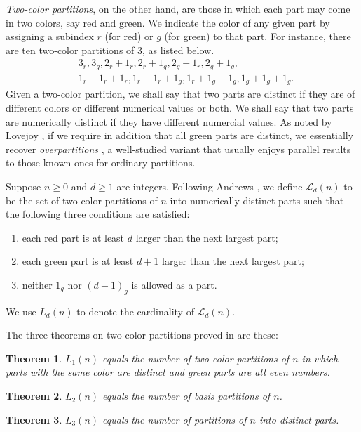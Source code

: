 \documentclass[11pt,reqno]{amsart}
\numberwithin{equation}{section}
\theoremstyle{plain}
\newtheorem{theorem}{Theorem}[section]
\theoremstyle{definition}
\renewcommand{\L}{\mathcal{L}}
\begin{document}
{\it Two-color partitions}, on the other hand, are those in which each part may come in two colors, say red and green. We indicate the color of any given part by assigning a subindex $r$ (for red) or $g$ (for green) to that part. For instance, there are ten two-color partitions of $3$, as listed below.
\begin{align*}
& 3_r, 3_g, 2_r+1_r, 2_r+1_g, 2_g+1_r, 2_g+1_g,\\
& 1_r+1_r+1_r, 1_r+1_r+1_g, 1_r+1_g+1_g, 1_g+1_g+1_g.
\end{align*}
Given a two-color partition, we shall say that two parts are distinct if they are of different colors or different numerical values or both. We shall say that two parts are numerically distinct if they have different numercial values. As noted by Lovejoy \cite[p.~395]{lov03}, if we require in addition that all green parts are distinct, we essentially recover {\it overpartitions} \cite{CJ}, a well-studied variant that usually enjoys parallel results to those known ones for ordinary partitions. 

Suppose $n\ge 0$ and $d\ge 1$ are integers. Following Andrews \cite{and21}, we define $\L_d(n)$ to be the set of two-color partitions of $n$ into numerically distinct parts such that the following three conditions are satisfied:
\begin{enumerate}
  \item each red part is at least $d$ larger than the next largest part;
  \item each green part is at least $d+1$ larger than the next largest part;
  \item neither $1_g$ nor $(d-1)_g$ is allowed as a part.
\end{enumerate}
We use $L_d(n)$ to denote the cardinality of $\L_d(n)$.

The three theorems on two-color partitions proved in \cite{and21} are these:

\begin{theorem}\label{thm:L1}
$L_1(n)$ equals the number of two-color partitions of $n$ in which parts with the same color are distinct and green parts are all even numbers.
\end{theorem}

\begin{theorem}\label{thm:L2}
$L_2(n)$ equals the number of basis partitions of $n$.
\end{theorem}

\begin{theorem}\label{thm:L3}
$L_3(n)$ equals the number of partitions of $n$ into distinct parts.
\end{theorem}
\end{document}
